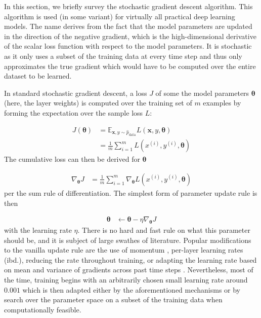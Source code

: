 In this section, we briefly survey the stochastic gradient descent algorithm.
This algorithm is used (in some variant) for virtually all practical deep
learning models. The name derives from the fact that the model parameters are
updated in the direction of the negative gradient, which is the high-dimensional
derivative of the scalar loss function with respect to the model parameters. It
is stochastic as it only uses a subset of the training data at every time step
and thus only approximates the true gradient which would have to be computed
over the entire dataset to be learned.

In standard stochastic gradient descent, a loss $J$ of some the
model parameters $\boldsymbol\theta$ (here, the layer weights) is computed over the training set of $m$
examples by forming the expectation over the sample loss $L$:

\begin{align}
    J(\boldsymbol\theta) &= \mathbb{E}_{\mathbf{x},y\sim\hat{p}_{\text{data}}} L(\mathbf{x}, y, \boldsymbol\theta) \\
                         &= \frac{1}{m}\sum_{i=1}^{m}L(x^{(i)}, y^{(i)}, \boldsymbol\theta)
\end{align}
The cumulative loss can then be derived for $\boldsymbol\theta$

\begin{align}
    \nabla_{\boldsymbol\theta}J &= \frac{1}{m}\sum_{i=1}^{m}\nabla_{\boldsymbol\theta}L(x^{(i)}, y^{(i)}, \boldsymbol\theta)
\end{align}
per the sum rule of differentiation. The simplest form of parameter update rule
is then

\begin{align}
    \boldsymbol\theta &\leftarrow \boldsymbol\theta - \eta \nabla_{\boldsymbol\theta}J
\end{align}
with the learning rate $\eta$. There is no hard and fast rule on what this
parameter should be, and it is subject of large swathes of literature. Popular
modifications to the vanilla update rule are the use of momentum
\citep{jacobs1988increased}, per-layer learning rates (ibd.), reducing the rate
throughout training, or adapting the
learning rate based on mean and variance of gradients across past time steps
\citep{kingma2014adam}. Nevertheless, most of the time, training begins with an
arbitrarily chosen small learning rate around $0.001$ which is then adapted
either by the aforementioned mechanisms or by search over the parameter space on
a subset of the training data when computationally feasible.

